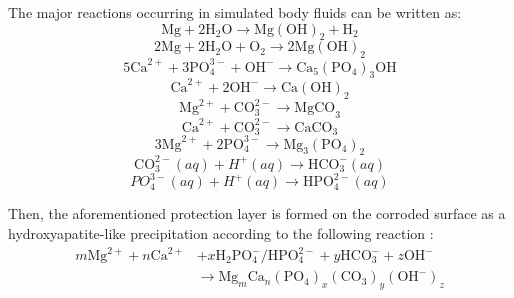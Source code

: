 The major reactions occurring in simulated body fluids can be written as:
\begin{equation}
\mathrm{Mg}+2 \mathrm{H}_{2} \mathrm{O} \rightarrow \mathrm{Mg}(\mathrm{OH})_{2}+\mathrm{H}_{2}
\end{equation}
\begin{equation}
2 \mathrm{Mg}+2 \mathrm{H}_{2} \mathrm{O}+\mathrm{O}_{2} \rightarrow 2 \mathrm{Mg}(\mathrm{OH})_{2}
\end{equation}
\begin{equation}
5 \mathrm{Ca}^{2+}+3 \mathrm{PO}_{4}^{3-}+\mathrm{OH}^{-} \rightarrow \mathrm{Ca}_{5}\left(\mathrm{PO}_{4}\right)_{3} \mathrm{OH}
\end{equation}
\begin{equation}
\mathrm{Ca}^{2+}+2 \mathrm{OH}^{-} \rightarrow \mathrm{Ca}(\mathrm{OH})_{2}
\end{equation}
\begin{equation}
\mathrm{Mg}^{2+}+\mathrm{CO}_{3}^{2-} \rightarrow \mathrm{MgCO}_{3}
\end{equation}
\begin{equation}
\mathrm{Ca}^{2+}+\mathrm{CO}_{3}^{2-} \rightarrow \mathrm{CaCO}_{3}
\end{equation}
\begin{equation}
 3 \mathrm{Mg}^{2+}+2 \mathrm{PO}_{4}^{3-} \rightarrow \mathrm{Mg}_{3}\left(\mathrm{PO}_{4}\right)_{2}
\end{equation}
\begin{equation}
\mathrm{CO}_{3}^{2-}(a q)+H^{+}(a q) \rightarrow \mathrm{HCO}_{3}^{-}(a q)
\end{equation}
\begin{equation}
P O_{4}^{3-}(a q)+H^{+}(a q)\rightarrow \mathrm{HPO}_{4}^{2-}(a q)
\end{equation}

Then, the aforementioned protection layer is formed on the corroded surface as a hydroxyapatite-like precipitation according to the following reaction \cite{Atrens2015,Song2009,Silva2018,Jiang2019}:
\begin{equation} \label{eq:kinetics_hydrox_react}
\begin{aligned}
m \mathrm{Mg}^{2+}+n \mathrm{Ca}^{2+}&+x \mathrm{H}_{2} \mathrm{PO}_{4}^{-} / \mathrm{HPO}_{4}^{2-}+y \mathrm{HCO}_{3}^{-}+z \mathrm{OH}^{-}\\
& \rightarrow \mathrm{Mg}_{m} \mathrm{Ca}_{n}\left(\mathrm{PO}_{4}\right)_{x}\left(\mathrm{CO}_{3}\right)_{y}\left(\mathrm{OH}^{-}\right)_{z}
\end{aligned}
\end{equation}

